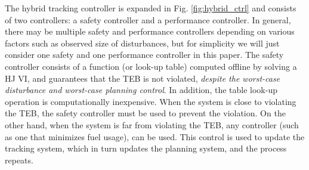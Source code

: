 


The hybrid tracking controller is expanded in Fig. \ref{fig:hybrid_ctrl} and consists of two controllers: a safety controller and a performance controller.
In general, there may be multiple safety and performance controllers depending on various factors such as observed size of disturbances, but for simplicity we will just consider one safety and one performance controller in this paper. 
The safety controller consists of a function (or look-up table) computed offline by solving a HJ VI, and guarantees that the TEB is not violated, \textit{despite the worst-case disturbance and worst-case planning control}. 
In addition, the table look-up operation is computationally inexpensive. 
When the system is close to violating the TEB, the safety controller must be used to prevent the violation. 
On the other hand, when the system is far from violating the TEB, any controller (such as one that minimizes fuel usage), can be used. 
This control is used to update the tracking system, which in turn updates the planning system, and the process repeats.

